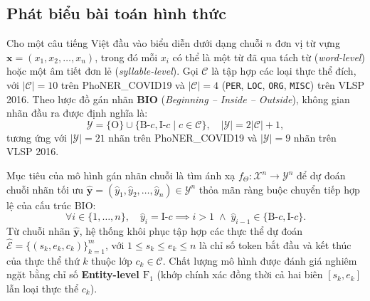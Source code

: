 \subsection{Phát biểu bài toán hình thức}
Cho một câu tiếng Việt đầu vào biểu diễn dưới dạng chuỗi $n$ đơn vị từ vựng $\mathbf{x} = (x_1, x_2, \dots, x_n)$, trong đó mỗi $x_i$ có thể là một từ đã qua tách từ (\textit{word-level}) hoặc một âm tiết đơn lẻ (\textit{syllable-level}). Gọi $\mathcal{C}$ là tập hợp các loại thực thể đích, với $|\mathcal{C}| = 10$ trên PhoNER\_COVID19 và $|\mathcal{C}| = 4$ (\texttt{PER}, \texttt{LOC}, \texttt{ORG}, \texttt{MISC}) trên VLSP 2016. Theo lược đồ gán nhãn \textbf{BIO} (\textit{Beginning -- Inside -- Outside}), không gian nhãn đầu ra được định nghĩa là:
\begin{equation}
    \mathcal{Y} = \{\text{O}\} \cup \{\text{B-}c, \text{I-}c \mid c \in \mathcal{C}\}, \quad |\mathcal{Y}| = 2|\mathcal{C}| + 1,
\end{equation}
tương ứng với $|\mathcal{Y}| = 21$ nhãn trên PhoNER\_COVID19 và $|\mathcal{Y}| = 9$ nhãn trên VLSP 2016.

Mục tiêu của mô hình gán nhãn chuỗi là tìm ánh xạ $f_{\Theta}: \mathcal{X}^n \to \mathcal{Y}^n$ để dự đoán chuỗi nhãn tối ưu $\hat{\mathbf{y}} = (\hat{y}_1, \hat{y}_2, \dots, \hat{y}_n) \in \mathcal{Y}^n$ thỏa mãn ràng buộc chuyển tiếp hợp lệ của cấu trúc BIO:
\begin{equation}
    \forall i \in \{1, \dots, n\}, \quad \hat{y}_i = \text{I-}c \implies i > 1 \;\wedge\; \hat{y}_{i-1} \in \{\text{B-}c, \text{I-}c\}.
\end{equation}
Từ chuỗi nhãn $\hat{\mathbf{y}}$, hệ thống khôi phục tập hợp các thực thể dự đoán $\hat{\mathcal{E}} = \{(s_k, e_k, c_k)\}_{k=1}^{m}$, với $1 \le s_k \le e_k \le n$ là chỉ số token bắt đầu và kết thúc của thực thể thứ $k$ thuộc lớp $c_k \in \mathcal{C}$. Chất lượng mô hình được đánh giá nghiêm ngặt bằng chỉ số \textbf{Entity-level $\text{F}_1$} (khớp chính xác đồng thời cả hai biên $[s_k, e_k]$ lẫn loại thực thể $c_k$).

